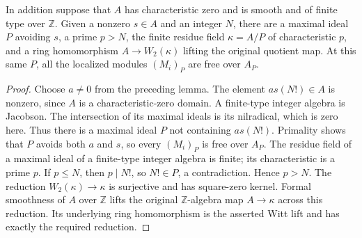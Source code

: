 \begin{lemma}
\label{lem:kn-relative-arithmetic-simultaneous-free-witt-point}
\leanok
In addition suppose that $A$ has characteristic zero and is smooth
and of finite type over $\mathbb Z$.  Given a nonzero $s\in A$ and
an integer $N$, there are a maximal ideal $P$ avoiding $s$, a prime
$p>N$, the finite residue field $\kappa=A/P$ of characteristic $p$,
and a ring homomorphism $A\to W_2(\kappa)$ lifting the original
quotient map.  At this same $P$, all the localized modules $(M_i)_P$
are free over $A_P$.
\end{lemma}
\begin{proof}
Choose $a\ne0$ from the preceding lemma.  The element
$as(N!)\in A$ is nonzero, since $A$ is a characteristic-zero domain.
A finite-type integer algebra is Jacobson.  The intersection of its
maximal ideals is its nilradical, which is zero here.  Thus there is
a maximal ideal $P$ not containing $as(N!)$.  Primality shows that
$P$ avoids both $a$ and $s$, so every $(M_i)_P$ is free over $A_P$.
The residue field of a maximal ideal of a finite-type integer algebra
is finite; its characteristic is a prime $p$.  If $p\leq N$, then
$p\mid N!$, so $N!\in P$, a contradiction.  Hence $p>N$.
The reduction $W_2(\kappa)\to\kappa$ is surjective and has square-zero
kernel.  Formal smoothness of $A$ over $\mathbb Z$ lifts the original
$\mathbb Z$-algebra map $A\to\kappa$ across this reduction.  Its
underlying ring homomorphism is the asserted Witt lift and has exactly
the required reduction.
\end{proof}
